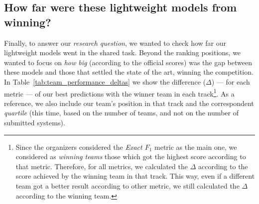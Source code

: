 \documentclass[11pt]{article}
\newcommand{\todo}[1]{\textcolor{blue}{\textbf{\small [TODO: #1]}}}
\begin{document}






\subsection{How far were these lightweight models from winning?}

Finally, to answer our \textit{research question}, we wanted to check how far our lightweight models went in the shared task.
Beyond the ranking positions, we wanted to focus on \textit{how big} (according to the official scores) was the gap between these models and those that settled the state of the art, winning the competition.
In Table~\ref{tab:team_performance_deltas} we show the difference ($\Delta$) --- for each metric --- of our best predictions with the winner team in each track\footnote{
Since the organizers considered the \textit{Exact $F_1$} metric as the main one, we considered as \textit{winning teams} those which got the highest score according to that metric.
Therefore, for all metrics, we calculated the $\Delta$ according to the score achieved by the winning team in that track. This way, even if a different team got a better result according to other metric, we still calculated the $\Delta$ according to the winning team.
}.
As a reference, we also include our team's position in that track and the correspondent \textit{quartile} (this time, based on the number of teams, and not on the number of submitted systems).

\end{document}
